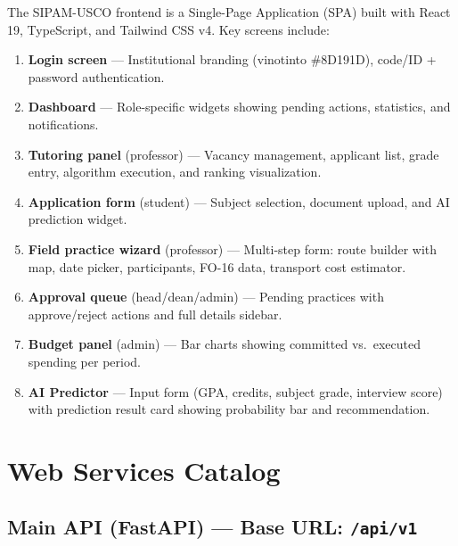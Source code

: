 \documentclass[12pt,a4paper]{article}
\begin{document}
The SIPAM-USCO frontend is a Single-Page Application (SPA) built with React 19, TypeScript,
and Tailwind CSS v4. Key screens include:

\begin{enumerate}
  \item \textbf{Login screen} — Institutional branding (vinotinto \#8D191D), code/ID + password authentication.
  \item \textbf{Dashboard} — Role-specific widgets showing pending actions, statistics, and notifications.
  \item \textbf{Tutoring panel} (professor) — Vacancy management, applicant list, grade entry, algorithm execution, and ranking visualization.
  \item \textbf{Application form} (student) — Subject selection, document upload, and AI prediction widget.
  \item \textbf{Field practice wizard} (professor) — Multi-step form: route builder with map, date picker, participants, FO-16 data, transport cost estimator.
  \item \textbf{Approval queue} (head/dean/admin) — Pending practices with approve/reject actions and full details sidebar.
  \item \textbf{Budget panel} (admin) — Bar charts showing committed vs.\ executed spending per period.
  \item \textbf{AI Predictor} — Input form (GPA, credits, subject grade, interview score) with prediction result card showing probability bar and recommendation.
\end{enumerate}

\section{Web Services Catalog}

\subsection{Main API (FastAPI) — Base URL: \texttt{/api/v1}}
\end{document}
